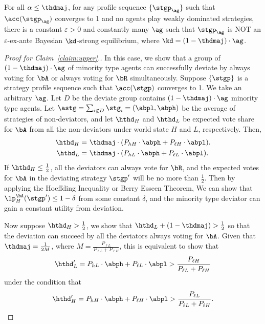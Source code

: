 \begin{claim}
\label{claim:upper}
    For all $\alpha \le \thdmaj$, for any profile sequence $\{\stgp_\ag\}$ such that $\acc(\stgp_\ag)$ converges to 1 and no agents play weakly dominated strategies, there is a constant $\varepsilon > 0$ and constantly many $\ag$ such that $\stgp_\ag$ is NOT an $\varepsilon$-ex-ante Bayesian $\kd$-strong equilibrium, where $\kd = (1 - \thdmaj)\cdot \ag$. 
\end{claim}
\begin{proof}[Proof for Claim~\ref{claim:upper}.] 
    In this case, we show that a group of $(1 - \thdmaj)\cdot \ag$ of minority type agents can successfully deviate by always voting for $\bA$ or always voting for $\bR$ simultaneously. Suppose $\{\stgp\}$ is a strategy profile sequence such that $\acc(\stgp)$ converges to 1. We take an arbitrary $\ag$. Let $D$ be the deviate group contains $(1 - \thdmaj)\cdot \ag$ minority type agents. Let $\astg = \sum_{i\not\in D} \stg_i = (\abpl, \abph)$ be the average of strategies of non-deviators, and
    let $\hthd_H$ and $\hthd_{L}$ be expected vote share for $\bA$ from all the non-deviators under world state $H$ and $L$, respectively. Then,
    \begin{align*}
        \hthd_H =&\ \thdmaj\cdot (P_{hH}\cdot \abph + P_{\ell H}\cdot \abpl).\\
        \hthd_L = &\ \thdmaj\cdot (P_{hL}\cdot \abph + P_{\ell L}\cdot \abpl).
    \end{align*}
    If $\hthd_H \le \frac{1}{2}$, all the deviators can always vote for $\bR$, and the expected votes for $\bA$ in the deviating strategy $\stgp'$ will be no more than $\frac{1}{2}$. Then by applying the Hoeffding Inequality or Berry Esseen Theorem, We can show that $\lp_{H}^{\bA}(\stgp') \le 1 - \delta$ from some constant $\delta$, and the minority type deviator can gain a constant utility from deviation. 

    Now suppose $\hthd_H > \frac{1}{2}$, we show that $\hthd_L + (1 - \thdmaj) > \frac12$ so that the deviation can succeed by all the deviators always voting for $\bA$. Given that $\thdmaj = \frac{1}{2M}$, where $M = \frac{P_{\ell L}}{P_{\ell L} + P_{\ell H}}$, this is equivalent to show that 
    \begin{equation*}
        \hthd'_L = P_{hL} \cdot \abph + P_{\ell L}\cdot \abpl > \frac{P_{\ell H}}{P_{\ell L} + P_{\ell H}}
    \end{equation*}
    under the condition that
    \begin{equation*}
        \hthd'_H = P_{hH} \cdot \abph + P_{\ell H}\cdot \abpl > \frac{P_{\ell L}}{P_{\ell L} + P_{\ell H}}.
    \end{equation*}


\end{proof}
